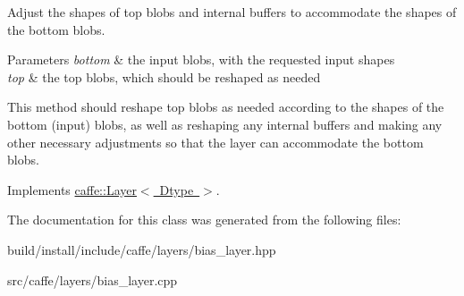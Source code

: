 Adjust the shapes of top blobs and internal buffers to accommodate the shapes of the bottom blobs. 


\begin{DoxyParams}{Parameters}
{\em bottom} & the input blobs, with the requested input shapes \\
\hline
{\em top} & the top blobs, which should be reshaped as needed\\
\hline
\end{DoxyParams}
This method should reshape top blobs as needed according to the shapes of the bottom (input) blobs, as well as reshaping any internal buffers and making any other necessary adjustments so that the layer can accommodate the bottom blobs. 

Implements \mbox{\hyperlink{classcaffe_1_1_layer_a7fe981e8af8d93d587acf2a952be563d}{caffe\+::\+Layer$<$ Dtype $>$}}.



The documentation for this class was generated from the following files\+:\begin{DoxyCompactItemize}
\item 
build/install/include/caffe/layers/bias\+\_\+layer.\+hpp\item 
src/caffe/layers/bias\+\_\+layer.\+cpp\end{DoxyCompactItemize}
